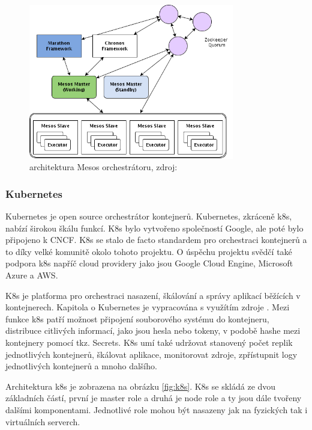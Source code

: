 \begin{figure}[H]
  \begin{centering}
	  \includegraphics[width=0.8\textwidth]{images/mesos.png}
    \par
	  \caption{architektura Mesos orchestrátoru\label{fig:mesos}, zdroj:}
    \end{centering}
\end{figure}

\subsubsection{Kubernetes}
Kubernetes je open source orchestrátor kontejnerů. Kubernetes, zkráceně k8s, nabízí širokou škálu funkcí. K8s bylo vytvořeno společností Google, ale poté bylo připojeno k CNCF. K8s se stalo de facto standardem pro orchestraci kontejnerů a to díky velké komunitě okolo tohoto projektu. O úspěchu projektu svědčí také podpora k8s napříč cloud providery jako jsou Google Cloud Engine, Microsoft Azure a AWS. \par
K8s je platforma pro orchestraci nasazení, škálování a správy aplikací běžících v kontejnerech. Kapitola o Kubernetes je vypracována s využítím zdroje \cite{MASTERING-KUBERNETES}. Mezi funkce k8s patří možnost připojení souborového systému do kontejneru, distribuce citlivých informací, jako jsou hesla nebo tokeny, v podobě hashe mezi kontejnery pomocí tkz. Secrets. K8s umí také udržovat stanovený počet replik jednotlivých kontejnerů, škálovat aplikace, monitorovat zdroje, zpřístupnit logy jednotlivých kontejnerů a mnoho dalšího. \par
Architektura k8s je zobrazena na obrázku \ref{fig:k8s}. K8s se skládá ze dvou základních částí, první je master role a druhá je node role a ty jsou dále tvořeny dalšími komponentami. Jednotlivé role mohou být nasazeny jak na fyzických tak i virtuálních serverch. \par

